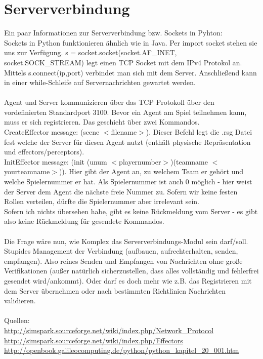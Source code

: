 \section*{Serververbindung}
Ein paar Informationen zur Serververbindung bzw. Sockets in Pyhton:\\
Sockets in Python funktionieren ähnlich wie in Java. Per \grqq import socket\grqq{} stehen sie uns zur Verfügung. s = socket.socket(socket.AF\_INET, socket.SOCK\_STREAM) legt einen TCP Socket mit dem IPv4 Protokol an. Mittels s.connect(ip,port) verbindet man sich mit dem Server. Anschließend kann in einer while-Schleife auf Servernachrichten gewartet werden.\\
\\
Agent und Server kommunizieren über das TCP Protokoll über den vordefinierten Standardport 3100. Bevor ein Agent am Spiel teilnehmen kann, muss er sich \grqq registrieren\grqq{}. Das geschieht über zwei Kommandos.\\
CreateEffector message: (scene $<$filename$>$). Dieser Befehl legt die .rsg Datei fest welche der Server für diesen Agent nutzt (enthält physische Repräsentation und effectors/perceptors).\\
InitEffector message: (init (unum $<$playernumber$>$)(teamname $<$yourteamname$>$)). Hier gibt der Agent an, zu welchem Team er gehört und welche Spielernummer er hat. Als Spielernummer ist auch 0 möglich - hier weist der Server dem Agent die nächste freie Nummer zu. Sofern wir keine festen Rollen verteilen, dürfte die Spielernummer aber irrelevant sein.\\
Sofern ich nichts übersehen habe, gibt es keine Rückmeldung vom Server - es gibt also keine Rückmeldung für gesendete Kommandos.\\
\\
Die Frage wäre nun, wie Komplex das Serververbindungs-Modul sein darf/soll. Stupides Management der Verbindung (aufbauen, aufrechterhalten, senden, empfangen). Also reines Senden und Empfangen von Nachrichten ohne große Verifikationen (außer natürlich sicherzustellen, dass alles vollständig und fehlerfrei gesendet wird/ankommt). Oder darf es doch mehr wie z.B. das Registrieren mit dem Server übernehmen oder nach bestimmten Richtlinien Nachrichten validieren.\\
\\
Quellen:\\
\url{http://simspark.sourceforge.net/wiki/index.php/Network\_Protocol}\\
\url{http://simspark.sourceforge.net/wiki/index.php/Effectors}\\
\url{http://openbook.galileocomputing.de/python/python\_kapitel\_20\_001.htm}\\